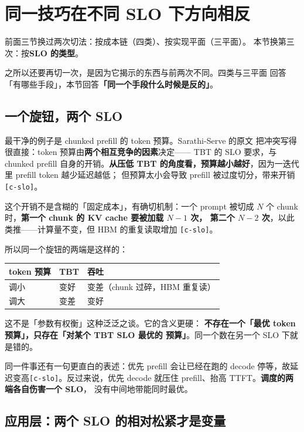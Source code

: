 \section{同一技巧在不同 SLO 下方向相反}
\label{sec:slo}

前面三节换过两次切法：按成本链（四类）、按实现平面（三平面）。
本节换第三次：按\textbf{SLO 的类型}。

之所以还要再切一次，是因为它揭示的东西与前两次不同。四类与三平面
回答「有哪些手段」，本节回答\textbf{「同一个手段什么时候是反的」}。

\subsection{一个旋钮，两个 SLO}

最干净的例子是 chunked prefill 的 token 预算。Sarathi-Serve 的原文
把冲突写得很直接：token 预算由\textbf{两个相互竞争的因素}决定——
TBT 的 SLO 要求，与 chunked prefill 自身的开销。\textbf{从压低 TBT
的角度看，预算越小越好}，因为一迭代里 prefill token 越少延迟越低；
但预算太小会导致 prefill 被过度切分，带来开销\texttt{[c-slo]}。

\noindent 这个开销不是含糊的「固定成本」，有确切机制：一个 prompt 被切成
$N$ 个 chunk 时，\textbf{第一个 chunk 的 KV cache 要被加载 $N-1$ 次，
第二个 $N-2$ 次}，以此类推——计算量不变，但 HBM 的重复读取增加
\texttt{[c-slo]}。

\noindent 所以同一个旋钮的两端是这样的：

\begin{center}
\small
\begin{tabular}{@{}p{2.3cm}p{2.2cm}p{2.2cm}@{}}
\toprule
token 预算 & TBT & 吞吐 \\
\midrule
调小 & 变好 & 变差（chunk 过碎，HBM 重复读） \\
调大 & 变差 & 变好 \\
\bottomrule
\end{tabular}
\end{center}

\noindent 这不是「参数有权衡」这种泛泛之谈。它的含义更硬：
\textbf{不存在一个「最优 token 预算」，只存在「对某个 TBT SLO 最优的
预算」}。同一个数在另一个 SLO 下就是错的。

\noindent 同一件事还有一句更直白的表述：优先 prefill 会让已经在跑的
decode 停等，故延迟变高\texttt{[c-slo]}。反过来说，优先 decode
就压住 prefill、抬高 TTFT。\textbf{调度的两端各自伤害一个 SLO}，
没有中间地带能同时最优。

\subsection{应用层：两个 SLO 的相对松紧才是变量}

